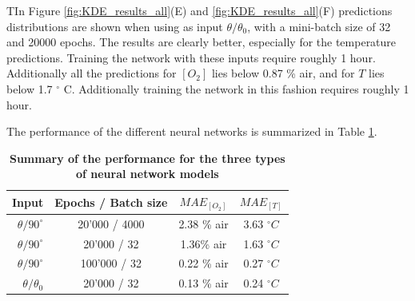 \documentclass[9pt,twocolumn,twoside,pdftex]{optica}
\begin{document}

TIn Figure \ref{fig:KDE_results_all}(E) and \ref{fig:KDE_results_all}(F) predictions distributions are shown when using as input $\theta/\theta_0$, with a mini-batch size of 32 and 20000 epochs. The results are clearly better, especially for the temperature predictions. Training the network with these inputs require roughly 1 hour. Additionally all the predictions for $[O_2]$ lies below 0.87 \% air, and for $T$ lies below 1.7 $^\circ$ C. Additionally training the network in this fashion requires roughly 1 hour. 




The performance of the different neural networks is summarized in Table \ref{TableMAE_summary}. 
\begin{table}[hbt]
\centering
\caption {\bf Summary of the performance for the three types of neural network models}

\begin{tabular}{ rccc}
\smallskip 
 Input & Epochs / Batch size & $MAE_{[O_2]}$ & $MAE_{[T]}$  \\ 
 \hline
$\theta / 90^\circ$ & 20'000 / 4000 & 2.38 \% air & 3.63 $^\circ C$\\ 
$\theta / 90^\circ$ & 20'000 / 32 & 1.36\% air & 1.63 $^\circ C$\\ 
$\theta / 90^\circ$& 100'000 / 32 & 0.22 \% air & 0.27 $^\circ C$\\ 
$\theta /\theta_0$ & 20'000 / 32 & 0.13 \% air & 0.24 $^\circ C$\\ 

\end{tabular}
\label{TableMAE_summary}
\end{table}
\end{document}

